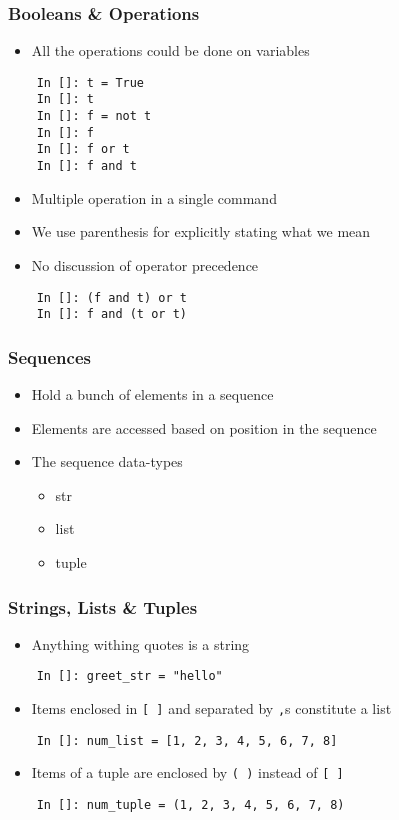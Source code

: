 \begin{frame}[fragile]
  \frametitle{Booleans \& Operations}
  \begin{itemize}
  \item All the operations could be done on variables
  \end{itemize}
  \begin{lstlisting}
    In []: t = True
    In []: t
    In []: f = not t
    In []: f
    In []: f or t
    In []: f and t
  \end{lstlisting}
  \begin{itemize}
  \item Multiple operation in a single command
  \item We use parenthesis for explicitly stating what we mean
  \item No discussion of operator precedence
  \end{itemize}
  \begin{lstlisting}
    In []: (f and t) or t
    In []: f and (t or t)
  \end{lstlisting}
\end{frame}

\begin{frame}[fragile]
  \frametitle{Sequences}
  \begin{itemize}
  \item Hold a bunch of elements in a sequence
  \item Elements are accessed based on position in the sequence
  \item The sequence data-types
    \begin{itemize}
    \item str
    \item list
    \item tuple
    \end{itemize}
  \end{itemize}
\end{frame}

\begin{frame}[fragile]
  \frametitle{Strings, Lists \& Tuples}
  \begin{itemize}
  \item Anything withing quotes is a string
  \end{itemize}
  \begin{lstlisting}
    In []: greet_str = "hello"
  \end{lstlisting}
  \begin{itemize}
  \item Items enclosed in \texttt{[ ]} and separated by \texttt{,}s
    constitute a list
  \end{itemize}
  \begin{lstlisting}
    In []: num_list = [1, 2, 3, 4, 5, 6, 7, 8]
  \end{lstlisting}
  \begin{itemize}
  \item Items of a tuple are enclosed by \texttt{( )} instead of
    \texttt{[ ]}  
  \end{itemize}
  \begin{lstlisting}
    In []: num_tuple = (1, 2, 3, 4, 5, 6, 7, 8)
  \end{lstlisting}
\end{frame}

